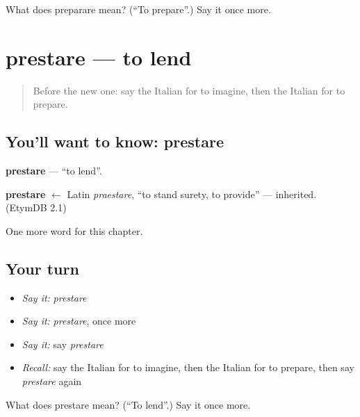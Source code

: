 \begin{tcolorbox}[breakable,colback=teal!4,colframe=teal!35!black,title={Before you move on}]
What does preparare mean? (\textquotedblleft{}To prepare\textquotedblright{}.) Say it once more.
\end{tcolorbox}
\section[prestare]{prestare — to lend}

\label{lesson:IT-C210-prestare}



\begin{quote}
Before the new one: say the Italian for to imagine, then the Italian for to prepare.
\end{quote}

\subsection*{You'll want to know: prestare}
\textbf{prestare} — \textquotedblleft{}to lend\textquotedblright{}.

\begin{cousinweb}
\textbf{prestare} $\leftarrow$ Latin \emph{praestare}, \textquotedblleft{}to stand surety, to provide\textquotedblright{} — inherited. (EtymDB 2.1)
\end{cousinweb}

\begin{grammarlens}[title={What you've built}]
One more word for this chapter.
\end{grammarlens}

\subsection*{Your turn}
\begin{itemize}
\raggedright
  \item \emph{Say it:} \emph{prestare}
  \item \emph{Say it:} \emph{prestare}, once more
  \item \emph{Say it:} say \emph{prestare}
  \item \emph{Recall:} say the Italian for to imagine, then the Italian for to prepare, then say \emph{prestare} again
\end{itemize}

\begin{tcolorbox}[breakable,colback=teal!4,colframe=teal!35!black,title={Before you move on}]
What does prestare mean? (\textquotedblleft{}To lend\textquotedblright{}.) Say it once more.
\end{tcolorbox}
